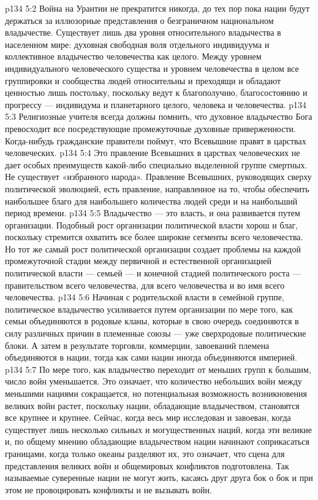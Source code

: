\vs p134 5:2 \pc Война на Урантии не прекратится никогда, до тех пор пока нации будут держаться за иллюзорные представления о безграничном национальном владычестве. Существует лишь два уровня относительного владычества в населенном мире: духовная свободная воля отдельного индивидуума и коллективное владычество человечества как целого. Между уровнем индивидуального человеческого существа и уровнем человечества в целом все группировки и сообщества людей относительны и преходящи и обладают ценностью лишь постольку, поскольку ведут к благополучию, благосостоянию и прогрессу --- индивидума и планетарного целого, человека и человечества.
\vs p134 5:3 Религиозные учителя всегда должны помнить, что духовное владычество Бога превосходит все посредствующие промежуточные духовные приверженности. Когда\hyp{}нибудь гражданские правители поймут, что Всевышние правят в царствах человеческих.
\vs p134 5:4 Это правление Всевышних в царствах человеческих не дает особых преимуществ какой\hyp{}либо специально выделенной группе смертных. Не существует «избранного народа». Правление Всевышних, руководящих сверху политической эволюцией, есть правление, направленное на то, чтобы обеспечить наибольшее благо для наибольшего количества людей среди  и на наибольший период времени.
\vs p134 5:5 Владычество --- это власть, и она развивается путем организации. Подобный рост организации политической власти хорош и благ, поскольку стремится охватить все более широкие сегменты всего человечества. Но тот же самый рост политической организации создает проблемы на каждой промежуточной стадии между первичной и естественной организацией политической власти --- семьей --- и конечной стадией политического роста --- правительством всего человечества, для всего человечества и во имя всего человечества.
\vs p134 5:6 Начиная с родительской власти в семейной группе, политическое владычество усиливается путем организации по мере того, как семьи объединяются в родовые кланы, которые в свою очередь соединяются в силу различных причин в племенные союзы --- уже сверхродовые политические блоки. А затем в результате торговли, коммерции, завоеваний племена объединяются в нации, тогда как сами нации иногда объединяются империей.
\vs p134 5:7 По мере того, как владычество переходит от меньших групп к большим, число войн уменьшается. Это означает, что количество небольших войн между меньшими нациями сокращается, но потенциальная возможность возникновения великих войн растет, поскольку нации, обладающие владычеством, становятся все крупнее и крупнее. Сейчас, когда весь мир исследован и завоеван, когда существует лишь несколько сильных и могущественных наций, когда эти великие и, по общему мнению обладающие владычеством нации начинают соприкасаться границами, когда только океаны разделяют их, это означает, что сцена для представления великих войн и общемировых конфликтов подготовлена. Так называемые суверенные нации не могут жить, касаясь друг друга бок о бок и при этом не провоцировать конфликты и не вызывать войн.
